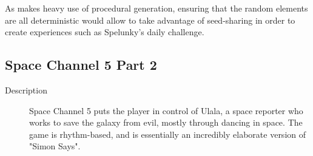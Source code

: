 \begin{description}
{As \ourgame{} makes heavy use of procedural generation, ensuring that the random elements are all deterministic would allow \ourteam{} to take advantage of seed-sharing in order to create experiences such as Spelunky's daily challenge.}
\end{description}



\clearpage
\subsection{Space Channel 5 Part 2}
\begin{description}
\item[Description]{Space Channel 5 puts the player in control of Ulala, a space reporter who works to save the galaxy from evil, mostly through dancing in space. The game is rhythm-based, and is essentially an incredibly elaborate version of "Simon Says".

}
\end{description}

